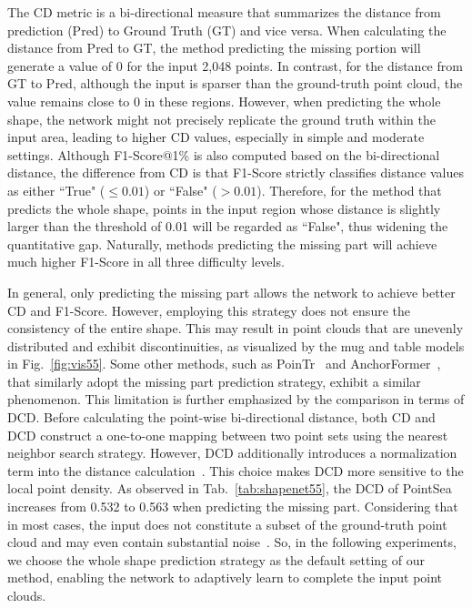 The CD metric is a bi-directional measure that summarizes the distance from prediction (Pred) to Ground Truth (GT) and vice versa. When calculating the distance from Pred to GT, the method predicting the missing portion will generate a value of 0 for the input 2,048 points. In contrast, for the distance from GT to Pred, although the input is sparser than the ground-truth point cloud, the value remains close to 0 in these regions. However, when predicting the whole shape, the network might not precisely replicate the ground truth within the input area, leading to higher CD values, especially in simple and moderate settings. 
Although F1-Score@1\% is also computed based on the bi-directional distance, the difference from CD is that F1-Score strictly classifies distance values as either ``True" ($\leq 0.01$) or ``False" ($> 0.01$). 
Therefore, for the method that predicts the whole shape, points in the input region whose distance is slightly larger than the threshold of 0.01 will be regarded as ``False", thus widening the quantitative gap. Naturally, methods predicting the missing part will achieve much higher F1-Score in all three difficulty levels.

In general, only predicting the missing part allows the network to achieve better CD and F1-Score. However, employing this strategy does not ensure the consistency of the entire shape. This may result in point clouds that are unevenly distributed and exhibit discontinuities, as visualized by the mug and table models in Fig.~\ref{fig:vis55}. Some other methods, such as PoinTr~\citep{yu2021pointr} and AnchorFormer~\citep{chen2023anchorformer}, that similarly adopt the missing part prediction strategy, exhibit a similar phenomenon. 
This limitation is further emphasized by the comparison in terms of DCD. Before calculating the point-wise bi-directional distance, both CD and DCD construct a one-to-one mapping between two point sets using the nearest neighbor search strategy. However, DCD additionally introduces a normalization term into the distance calculation~\citep{wu2021balanced}.
This choice makes DCD more sensitive to the local point density. As observed in Tab.~\ref{tab:shapenet55}, the DCD of PointSea increases from 0.532 to 0.563 when predicting the missing part.
Considering that in most cases, the input does not constitute a subset of the ground-truth point cloud and may even contain substantial noise~\citep{10232862}. So, in the following experiments, we choose the whole shape prediction strategy as the default setting of our method, enabling the network to adaptively learn to complete the input point clouds.

